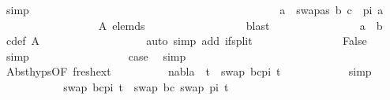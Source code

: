 \begin{isabellebody}
\ simp\isanewline
\ \ \ \ \ \ \ \ \ \ \ \ \isamarkupfalse%
\isanewline
\ \ \ \ \ \ \ \ \ \ \ \ \ \ \isamarkupfalse%
\ {}\isanewline
\ \ \ \ \ \ \ \ \ \ \ \ \ \ \isamarkupfalse%
\ {\isachardoublequoteopen}a\ {\isasymnoteq}\ swapas\ {\isacharparenleft}{\kern0pt}{\isacharparenleft}{\kern0pt}b{\isacharcomma}{\kern0pt}\ c{\isacharparenright}{\kern0pt}\ {\isacharhash}{\kern0pt}\ pi{\isacharparenright}{\kern0pt}\ a{\isachardoublequoteclose}\ \isanewline
\ \ \ \ \ \ \ \ \ \ \ \ \ \ \ \ \isamarkupfalse%
\ A\ elem{\isacharunderscore}{\kern0pt}ds\isanewline
\ \ \ \ \ \ \ \ \ \ \ \ \ \ \ \ \isamarkupfalse%
\ blast\isanewline
\ \ \ \ \ \ \ \ \ \ \ \ \ \ \isamarkupfalse%
\ {\isachardoublequoteopen}a\ {\isasymnoteq}\ b{\isachardoublequoteclose}\ \isamarkupfalse%
\ c{\isacharunderscore}{\kern0pt}def\ A\ \isanewline
\ \ \ \ \ \ \ \ \ \ \ \ \ \ \ \ \isamarkupfalse%
\ {\isacharparenleft}{\kern0pt}auto\ simp\ add{\isacharcolon}{\kern0pt}\ if{\isacharunderscore}{\kern0pt}split{\isacharparenright}{\kern0pt}\isanewline
\ \ \ \ \ \ \ \ \ \ \ \ \ \ \isamarkupfalse%
\ False\ \isamarkupfalse%
\ {}\ \isamarkupfalse%
\ simp\isanewline
\ \ \ \ \ \ \ \ \ \ \ \ \ \ \isamarkupfalse%
\ \isamarkupfalse%
\ {\isacharquery}{\kern0pt}case\ \isamarkupfalse%
\ simp\isanewline
\ \ \ \ \ \ \ \ \ \ \isamarkupfalse%
\isanewline
\ \ \ \ \ \ \ \ \isamarkupfalse%
\isanewline
\ \ \ \ \ \ \isamarkupfalse%
\isanewline
\ \ \ \ \ \ \ \ \isamarkupfalse%
\ Abst{\isachardot}{\kern0pt}hyps{\isacharbrackleft}{\kern0pt}OF\ fresh{\isacharunderscore}{\kern0pt}ext{\isacharbrackright}{\kern0pt}\isanewline
\ \ \ \ \ \ \ \ \isamarkupfalse%
\ {\isachardoublequoteopen}nabla\ {\isasymturnstile}\ t{\isacharprime}{\kern0pt}\ {\isasymapprox}\ swap\ {\isacharparenleft}{\kern0pt}{\isacharbrackleft}{\kern0pt}{\isacharparenleft}{\kern0pt}b{\isacharcomma}{\kern0pt}c{\isacharparenright}{\kern0pt}{\isacharbrackright}{\kern0pt}{\isacharat}{\kern0pt}pi{\isacharparenright}{\kern0pt}\ t{\isacharprime}{\kern0pt}{\isachardoublequoteclose}\isanewline
\ \ \ \ \ \ \ \ \ \ \isamarkupfalse%
\ simp\isanewline
\ \ \ \ \ \ \ \ \isamarkupfalse%
\ \isamarkupfalse%
\ {\isachardoublequoteopen}swap\ {\isacharparenleft}{\kern0pt}{\isacharbrackleft}{\kern0pt}{\isacharparenleft}{\kern0pt}b{\isacharcomma}{\kern0pt}c{\isacharparenright}{\kern0pt}{\isacharbrackright}{\kern0pt}{\isacharat}{\kern0pt}pi{\isacharparenright}{\kern0pt}\ t{\isacharprime}{\kern0pt}\ {\isacharequal}{\kern0pt}\ swap\ {\isacharbrackleft}{\kern0pt}{\isacharparenleft}{\kern0pt}b{\isacharcomma}{\kern0pt}c{\isacharparenright}{\kern0pt}{\isacharbrackright}{\kern0pt}\ {\isacharparenleft}{\kern0pt}swap\ pi\ t{\isacharprime}{\kern0pt}{\isacharparenright}{\kern0pt}{\isachardoublequoteclose}\isanewline

\end{isabellebody}

